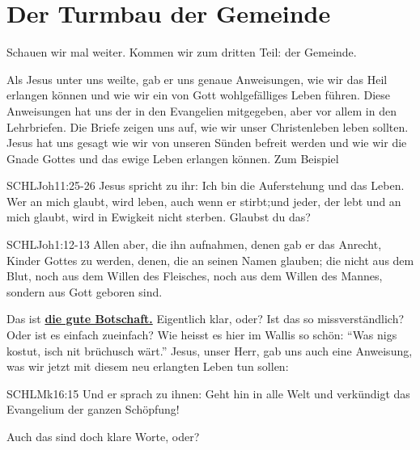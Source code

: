 \documentclass[fontsize=16pt]{mybib}
\begin{document}
    \section{Der Turmbau der Gemeinde}
    Schauen wir mal weiter. Kommen wir zum dritten Teil:  der Gemeinde.
    \begin{otsblock}
    Als Jesus unter uns weilte, gab er uns genaue Anweisungen, wie wir das Heil erlangen können und wie wir ein von Gott wohlgefälliges Leben führen. Diese Anweisungen hat uns der \herr{} in den Evangelien mitgegeben, aber vor allem in den Lehrbriefen. Die Briefe zeigen uns auf, wie wir unser Christenleben leben sollten.
    Jesus hat uns gesagt wie wir von unseren Sünden befreit werden und wie wir die Gnade Gottes und das ewige Leben erlangen können. Zum Beispiel
    \begin{bibelbox}{SCHL}{Joh}{11:25-26}
        Jesus spricht zu ihr: Ich bin die Auferstehung und das Leben. Wer an mich glaubt, wird leben, auch wenn er stirbt;und jeder, der lebt und an mich glaubt, wird in Ewigkeit nicht sterben. Glaubst du das?
    \end{bibelbox} 
    \begin{bibelbox}{SCHL}{Joh}{1:12-13}
        Allen aber, die ihn aufnahmen, denen gab er das Anrecht, Kinder Gottes zu werden, denen, die an seinen Namen glauben;
        die nicht aus dem Blut, noch aus dem Willen des Fleisches, noch aus dem Willen des Mannes, sondern aus Gott geboren sind.
    \end{bibelbox} 
    Das ist \textbf{\underline{die gute Botschaft.}}
    Eigentlich klar, oder? Ist das so missverständlich? Oder ist es einfach zueinfach? Wie heisst es hier im Wallis so schön: \enquote{Was nigs kostut, isch nit brüchusch wärt.} Jesus, unser Herr, gab uns auch eine Anweisung, was wir jetzt mit diesem neu erlangten Leben tun sollen:
    \begin{bibelbox}{SCHL}{Mk}{16:15}
        Und er sprach zu ihnen: Geht hin in alle Welt und verkündigt das Evangelium der ganzen Schöpfung!
    \end{bibelbox} 
    Auch das sind doch klare Worte, oder?
\end{otsblock}
\end{document}
